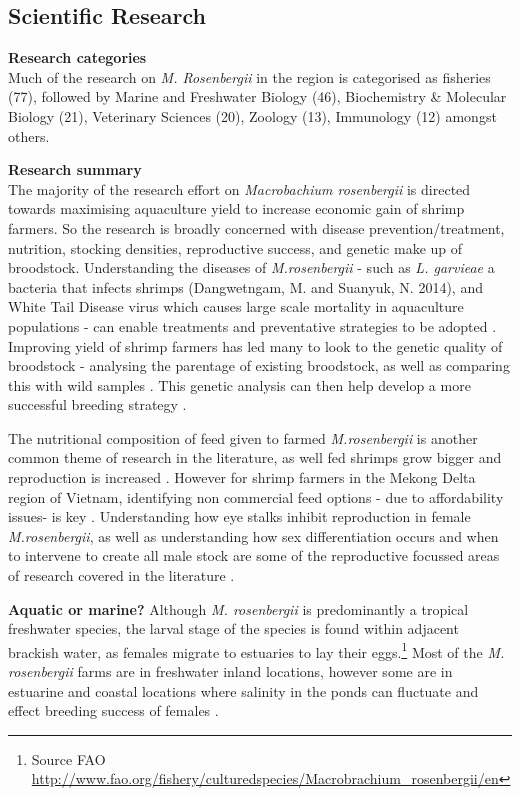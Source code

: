 \documentclass[]{book}
\theoremstyle{definition}
\theoremstyle{definition}
\theoremstyle{definition}
\theoremstyle{remark}
\begin{document}
\hypertarget{scientific-research-3}{%
\subsection{Scientific Research}\label{scientific-research-3}}

\textbf{Research categories}\\
Much of the research on \emph{M. Rosenbergii} in the region is
categorised as fisheries (77), followed by Marine and Freshwater Biology
(46), Biochemistry \& Molecular Biology (21), Veterinary Sciences (20),
Zoology (13), Immunology (12) amongst others.

\textbf{Research summary}\\
The majority of the research effort on \emph{Macrobachium rosenbergii}
is directed towards maximising aquaculture yield to increase economic
gain of shrimp farmers. So the research is broadly concerned with
disease prevention/treatment, nutrition, stocking densities,
reproductive success, and genetic make up of broodstock. Understanding
the diseases of \emph{M.rosenbergii} - such as \emph{L. garvieae} a
bacteria that infects shrimps (Dangwetngam, M. and Suanyuk, N. 2014),
and White Tail Disease virus which causes large scale mortality in
aquaculture populations - can enable treatments and preventative
strategies to be adopted \citep{Bonami_2011}. Improving yield of shrimp
farmers has led many to look to the genetic quality of broodstock -
analysing the parentage of existing broodstock, as well as comparing
this with wild samples \citep{Karaket_2012, Nguyen_Thanh_2015}. This
genetic analysis can then help develop a more successful breeding
strategy \citep{Thanh_2010}.

The nutritional composition of feed given to farmed \emph{M.rosenbergii}
is another common theme of research in the literature, as well fed
shrimps grow bigger and reproduction is increased
\citep{Kangpanich_2016}. However for shrimp farmers in the Mekong Delta
region of Vietnam, identifying non commercial feed options - due to
affordability issues- is key \citep{Hien_2005}. Understanding how eye
stalks inhibit reproduction in female \emph{M.rosenbergii}, as well as
understanding how sex differentiation occurs and when to intervene to
create all male stock are some of the reproductive focussed areas of
research covered in the literature
\citep{Sripiromrak_2014, Jung_2016, Rungsin_2012}.

\textbf{Aquatic or marine?} Although \emph{M. rosenbergii} is
predominantly a tropical freshwater species, the larval stage of the
species is found within adjacent brackish water, as females migrate to
estuaries to lay their eggs.\footnote{Source FAO
  \url{http://www.fao.org/fishery/culturedspecies/Macrobrachium_rosenbergii/en}}
Most of the \emph{M. rosenbergii} farms are in freshwater inland
locations, however some are in estuarine and coastal locations where
salinity in the ponds can fluctuate and effect breeding success of
females \citep{Yen_2008}.
\end{document}
